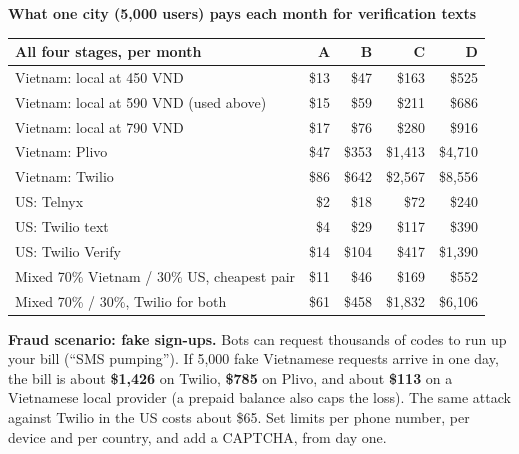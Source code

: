 \documentclass[11pt,a4paper]{article}
\begin{document}
\vspace{6pt}
\textbf{What one city (5,000 users) pays each month for verification texts}

\begin{center}
\end{center}

\begin{tabular}{@{}p{80mm}rrrr@{}}
\toprule
\textbf{All four stages, per month} & \textbf{A} & \textbf{B} & \textbf{C} & \textbf{D} \\
\midrule
Vietnam: local at 450 VND & \$13 & \$47 & \$163 & \$525 \\
Vietnam: local at 590 VND (used above) & \$15 & \$59 & \$211 & \$686 \\
Vietnam: local at 790 VND & \$17 & \$76 & \$280 & \$916 \\
Vietnam: Plivo & \$47 & \$353 & \$1,413 & \$4,710 \\
Vietnam: Twilio & \$86 & \$642 & \$2,567 & \$8,556 \\
US: Telnyx & \$2 & \$18 & \$72 & \$240 \\
US: Twilio text & \$4 & \$29 & \$117 & \$390 \\
US: Twilio Verify & \$14 & \$104 & \$417 & \$1,390 \\
\midrule
Mixed 70\% Vietnam / 30\% US, cheapest pair & \$11 & \$46 & \$169 & \$552 \\
Mixed 70\% / 30\%, Twilio for both & \$61 & \$458 & \$1,832 & \$6,106 \\
\bottomrule
\end{tabular}

\begin{tcolorbox}[colback=ember!10,colframe=ember!10]
\textbf{Fraud scenario: fake sign-ups.} Bots can request thousands of codes to run up your bill (``SMS pumping''). If 5,000 fake Vietnamese requests arrive in one day, the bill is about \textbf{\$1,426} on Twilio, \textbf{\$785} on Plivo, and about \textbf{\$113} on a Vietnamese local provider (a prepaid balance also caps the loss). The same attack against Twilio in the US costs about \$65. Set limits per phone number, per device and per country, and add a CAPTCHA, from day one.
\end{tcolorbox}
\end{document}

